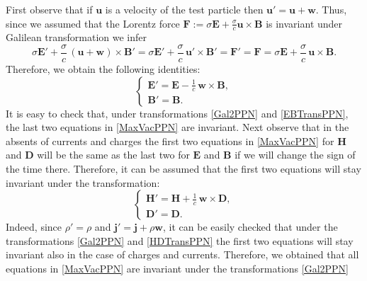 \documentclass{article}
\theoremstyle{definition}
\theoremstyle{remark}
\renewcommand{\vec}[1]{\mathbf{#1}}
\newcommand{\er}{\eqref}
\newcommand{\er}{\eqref}
\begin{document}
First observe that if
$\vec u$ is a velocity of the test particle then $\vec u'=\vec
u+\vec w$. Thus, since we assumed that the Lorentz force $\vec
F:=\sigma \vec E+\frac{\sigma}{c}\vec u\times \vec B$ is invariant
under Galilean transformation we infer $$\sigma \vec
E'+\frac{\sigma}{c}\, (\vec u+\vec w)\times \vec B'=\sigma \vec
E'+\frac{\sigma}{c}\, \vec u'\times \vec B'=\vec F'=\vec F=\sigma
\vec E+\frac{\sigma}{c}\, \vec u\times \vec B.$$ Therefore, we
obtain the following identities:
\begin{equation}\label{EBTransPPN}
\begin{cases}
\vec E'=\vec E-\frac{1}{c}\,\vec w\times \vec B,\\
\vec B'=\vec B.
\end{cases}
\end{equation}
It is easy to check that, under transformations \er{Gal2PPN} and
\er{EBTransPPN}, the last two equations in \er{MaxVacPPN} are
invariant. Next observe that in the absents of currents and charges
the first two equations in \er{MaxVacPPN} for $\vec H$ and $\vec D$
will be the same as the last two for $\vec E$ and $\vec B$ if we
will change the sign of the time there. Therefore, it can be assumed
that the first two equations will stay invariant under the
transformation:
\begin{equation}\label{HDTransPPN}
\begin{cases}
\vec H'=\vec H+\frac{1}{c}\,\vec w\times \vec D,\\
\vec D'=\vec D.
\end{cases}
\end{equation}
Indeed, since $\rho'=\rho$ and $\vec j'=\vec j+\rho \vec w$, it can
be easily checked that under the transformations \er{Gal2PPN} and
\er{HDTransPPN} the first two equations will stay invariant also in
the case of charges and currents. Therefore, we obtained that all
equations in \er{MaxVacPPN} are invariant under the transformations
\er{Gal2PPN}
%
%
%
\begin{comment}
\begin{equation}\label{Gal1}
\begin{cases}
\vec x'=\vec x+t\vec w,\\
t'=t.
\end{cases}
\end{equation}
\begin{equation}\label{EBDHTrans}
\begin{cases}
\vec D'=\vec D,\\
\vec B'=\vec B,\\
\vec E'=\vec E-\frac{1}{c}\,\vec w\times \vec B,\\
\vec H'=\vec H+\frac{1}{c}\,\vec w\times \vec D.
\end{cases}
\end{equation}
\end{comment}
\end{document}
